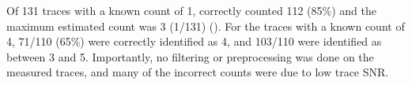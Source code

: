 Of 131 traces with a known count of 1, \ours correctly counted 112 (85\%) and the maximum estimated count was 3 (1/131) ().
	For the traces with a known count of 4, 71/110 (65\%) were correctly identified as 4, and 103/110 were identified as between 3 and 5.
	Importantly, no filtering or preprocessing was done on the measured traces, and many of the incorrect counts were due to low trace SNR. %

